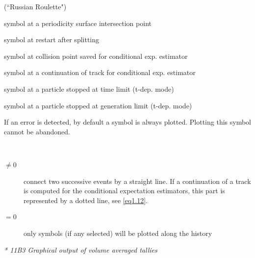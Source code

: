 \begin{description}
\begin{description}
                (``Russian Roulette")
          \item[9] symbol at a periodicity surface intersection
                point
          \item[10] symbol at restart after splitting
          \item[11] symbol at collision
                point saved for conditional exp.
                estimator
          \item[12]
                symbol at a continuation of track for conditional exp.
                estimator
          \item[13]
                symbol at a particle stopped at time limit (t-dep. mode)
          \item[14]
                symbol at a particle stopped at generation limit (t-dep. mode)
          \item[15]
                If an error is detected, by default a symbol is always plotted.
                Plotting this symbol cannot be abandoned.
        \end{description}
  \item[ILINIE] ~
        \begin{description}
          \item[$\ne 0$] connect two successive
                events by a straight line.
                If a continuation of a track is computed for the conditional expectation
                estimators, this part is represented by a dotted line, see \cref{eq1.12}.
          \item[$= 0$] only symbols (if any selected) will be plotted along the history
        \end{description}
\end{description}

\textsl{* 11B3 Graphical output of volume averaged tallies}

